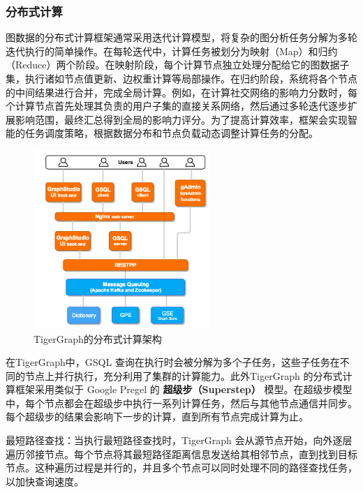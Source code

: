 \subsubsection{分布式计算}
图数据的分布式计算框架通常采用迭代计算模型，将复杂的图分析任务分解为多轮迭代执行的简单操作。在每轮迭代中，计算任务被划分为映射（Map）和归约（Reduce）两个阶段。在映射阶段，每个计算节点独立处理分配给它的图数据子集，执行诸如节点值更新、边权重计算等局部操作。在归约阶段，系统将各个节点的中间结果进行合并，完成全局计算。例如，在计算社交网络的影响力分数时，每个计算节点首先处理其负责的用户子集的直接关系网络，然后通过多轮迭代逐步扩展影响范围，最终汇总得到全局的影响力评分。为了提高计算效率，框架会实现智能的任务调度策略，根据数据分布和节点负载动态调整计算任务的分配。
\begin{figure}[H]
	\centering
	\includegraphics[width=0.6\textwidth]{images/25.png}
	\caption{TigerGraph的分布式计算架构}
	\label{fig:tigergraph}
\end{figure}
在TigerGraph中，GSQL 查询在执行时会被分解为多个子任务，这些子任务在不同的节点上并行执行，充分利用了集群的计算能力。此外TigerGraph 的分布式计算框架采用类似于 Google Pregel 的 \textbf{超级步（Superstep）} 模型。在超级步模型中，每个节点都会在超级步中执行一系列计算任务，然后与其他节点通信并同步。每个超级步的结果会影响下一步的计算，直到所有节点完成计算为止。

最短路径查找：当执行最短路径查找时，TigerGraph 会从源节点开始，向外逐层遍历邻接节点。每个节点将其最短路径距离信息发送给其相邻节点，直到找到目标节点。这种遍历过程是并行的，并且多个节点可以同时处理不同的路径查找任务，以加快查询速度。
